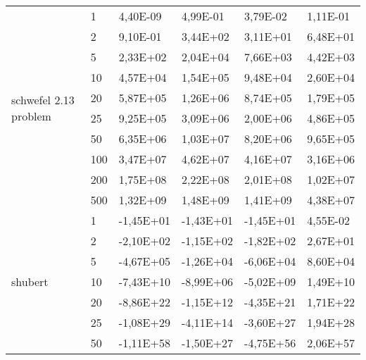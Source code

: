 \begin{longtable}[c]{|m{3.5cm}|l|l|l|l|l|}
\multirow{10}{*}{schwefel 2.13 problem} & 1         & 4,40E-09   & 4,99E-01   & 3,79E-02   & 1,11E-01  \\ \cline{2-6} 
                                        & 2         & 9,10E-01   & 3,44E+02   & 3,11E+01   & 6,48E+01  \\ \cline{2-6} 
                                        & 5         & 2,33E+02   & 2,04E+04   & 7,66E+03   & 4,42E+03  \\ \cline{2-6} 
                                        & 10        & 4,57E+04   & 1,54E+05   & 9,48E+04   & 2,60E+04  \\ \cline{2-6} 
                                        & 20        & 5,87E+05   & 1,26E+06   & 8,74E+05   & 1,79E+05  \\ \cline{2-6} 
                                        & 25        & 9,25E+05   & 3,09E+06   & 2,00E+06   & 4,86E+05  \\ \cline{2-6} 
                                        & 50        & 6,35E+06   & 1,03E+07   & 8,20E+06   & 9,65E+05  \\ \cline{2-6} 
                                        & 100       & 3,47E+07   & 4,62E+07   & 4,16E+07   & 3,16E+06  \\ \cline{2-6} 
                                        & 200       & 1,75E+08   & 2,22E+08   & 2,01E+08   & 1,02E+07  \\ \cline{2-6} 
                                        & 500       & 1,32E+09   & 1,48E+09   & 1,41E+09   & 4,38E+07  \\ \hline
\multirow{10}{*}{shubert}               & 1         & -1,45E+01  & -1,43E+01  & -1,45E+01  & 4,55E-02  \\ \cline{2-6} 
                                        & 2         & -2,10E+02  & -1,15E+02  & -1,82E+02  & 2,67E+01  \\ \cline{2-6} 
                                        & 5         & -4,67E+05  & -1,26E+04  & -6,06E+04  & 8,60E+04  \\ \cline{2-6} 
                                        & 10        & -7,43E+10  & -8,99E+06  & -5,02E+09  & 1,49E+10  \\ \cline{2-6} 
                                        & 20        & -8,86E+22  & -1,15E+12  & -4,35E+21  & 1,71E+22  \\ \cline{2-6} 
                                        & 25        & -1,08E+29  & -4,11E+14  & -3,60E+27  & 1,94E+28  \\ \cline{2-6} 
                                        & 50        & -1,11E+58  & -1,50E+27  & -4,75E+56  & 2,06E+57  \\ \cline{2-6} 

\end{longtable}
